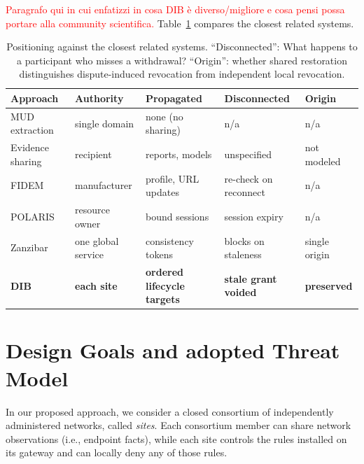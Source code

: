 \documentclass[journal]{IEEEtran}
\theoremstyle{definition}
\begin{document}
\textcolor{red}{Paragrafo qui in cui enfatizzi in cosa DIB è diverso/migliore e cosa pensi possa portare alla community scientifica.} Table~\ref{tab:positioning} compares the closest related systems. 

\begin{table}[ht]
\centering
\caption{Positioning against the closest related systems.
``Disconnected'': What happens to a participant who misses a withdrawal?
``Origin'': whether shared restoration distinguishes dispute-induced revocation from independent local revocation.}
\label{tab:positioning}
\scriptsize
\setlength{\tabcolsep}{3pt}
\renewcommand{\arraystretch}{1.05}
\begin{tabular}{@{}>{\raggedright\arraybackslash}p{1.52cm}>{\raggedright\arraybackslash}p{1.32cm}>{\raggedright\arraybackslash}p{1.84cm}>{\raggedright\arraybackslash}p{1.56cm}>{\raggedright\arraybackslash}p{1.26cm}@{}}
\toprule
Approach & Authority & Propagated & Disconnected & Origin \\
\midrule
MUD extraction~\cite{clearasmud, hamzatdsc, mudscope} & single domain & none (no sharing) & n/a & n/a \\
Evidence sharing~\cite{wagner2016misp, stix21, colearn} & recipient & reports, models & unspecified & not modeled \\
FIDEM~\cite{fidem} & manufacturer & profile, URL updates & re-check on reconnect & n/a \\
POLARIS~\cite{polaris} & resource owner & bound sessions & session expiry & n/a \\
Zanzibar~\cite{zanzibar} & one global service & consistency tokens & blocks on staleness & single origin \\
\textbf{DIB} & \textbf{each site} & \textbf{ordered lifecycle targets} & \textbf{stale grant voided} & \textbf{preserved} \\
\bottomrule
\end{tabular}
\end{table}



\section{Design Goals and adopted Threat Model}
\label{sec:threat}

In our proposed approach, we consider a closed consortium of independently administered networks, called \emph{sites}.
Each consortium member can share network observations (i.e., endpoint facts), while each site controls the rules installed on its gateway and can locally deny any of those rules.
\end{document}
